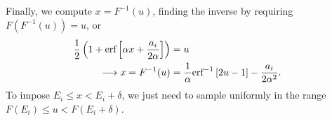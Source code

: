 \documentclass[12 pt]{article}
\newcommand{\al}{\ensuremath{\alpha} }
\newcommand{\de}{\ensuremath{\delta} }
\newcommand{\lra}{\ensuremath{\longrightarrow} }
\newcommand{\erf}{\ensuremath{\mbox{erf}} }
\begin{document}
Finally, we compute $x = F^{-1}(u)$, finding the inverse by requiring $F(F^{-1}(u)) = u$, or
\begin{align}
  \frac{1}{2} \left(1 + \erf\left[\al x + \frac{a_i}{2\al}\right]\right) & = u \cr
                                                      \lra x = F^{-1}(u) & = \frac{1}{\al} \erf^{-1}\left[2u -1\right] - \frac{a_i}{2\al^2}.
\end{align}
To impose $E_i \leq x < E_i + \de$, we just need to sample uniformly in the range $F(E_i) \leq u < F(E_i + \de)$.
\end{document}
